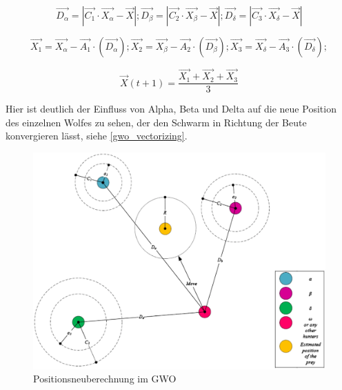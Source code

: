 \begin{equation}
    \vec{D_\alpha} = |\vec{C_1} \cdot \vec{X_\alpha} - \vec{X}|;
    \vec{D_\beta} = |\vec{C_2} \cdot \vec{X_\beta} - \vec{X}|;
    \vec{D_\delta} = |\vec{C_3} \cdot \vec{X_\delta} - \vec{X}|
    \label{calcD_abc}
\end{equation}

\begin{equation}
    \vec{X_1} = \vec{X_\alpha} - \vec{A_1} \cdot (\vec{D_\alpha});
    \vec{X_2} = \vec{X_\beta} - \vec{A_2} \cdot (\vec{D_\beta});
    \vec{X_3} = \vec{X_\delta} - \vec{A_3} \cdot (\vec{D_\delta});
    \label{calcX_123}
\end{equation}

\begin{equation}
    \vec{X}(t+1) = \frac{\vec{X_1} + \vec{X_2} + \vec{X_3}}{3}
    \label{calcNextP2}
\end{equation}

Hier ist deutlich der Einfluss von Alpha, Beta und Delta auf die neue Position des einzelnen Wolfes zu sehen, der den Schwarm in Richtung der Beute konvergieren lässt, siehe \autoref{gwo_vectorizing}.

\begin{figure}[ht]
    \begin{center}
        \includegraphics[width=1.0\textwidth]{assets/img/tgis12517-fig-0002-m.png}
        \caption[Positionsneuberechnung im GWO]{Positionsneuberechnung im GWO \cite{MIRJALILI201446}}
        \label{gwo_vectorizing}
    \end{center}
\end{figure}

